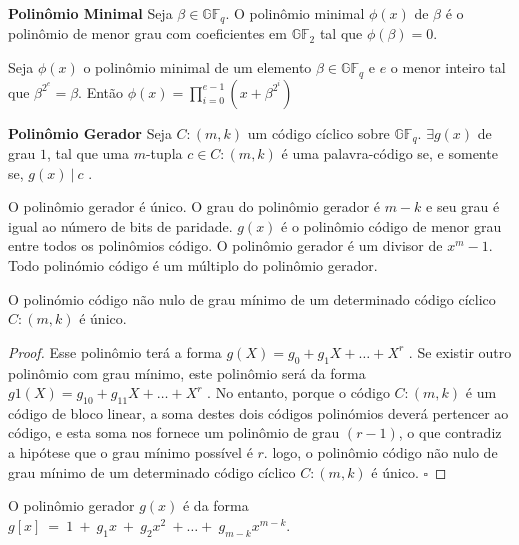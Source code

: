 \begin{definition} {\bf Polinômio Minimal} \label{PolMinimal}   Seja $\beta \in \mathbb{GF}_q$. O polinômio minimal $\phi(x)$ de $\beta$ é o polinômio de menor grau com coeficientes em $\mathbb{GF}_2$ tal que $\phi(\beta)=0$.
\end{definition}

\begin{theorem} Seja $\phi(x)$ o polinômio minimal de um elemento $\beta \in \mathbb{GF}_q$ e $e$ o menor inteiro tal que $\beta^{2^{e}}=\beta$. Então $\phi(x)= \displaystyle\prod\limits_{i=0}^{e-1} (x + \beta^{2^{i}})$
\end{theorem}

\begin{definition} {\bf Polinômio Gerador} \label{PolGer}  Seja $C:(m,k)$ um código cíclico sobre $\mathbb{GF}_q$. $\exists g(x)$ de grau $1$, tal que uma $m$-tupla $c \in C:(m,k)$ é uma palavra-código se, e somente se, $g(x)\ |\ c$ .
\end{definition}

\begin{property} O polinômio gerador é único. O grau do polinômio gerador é $m-k$ e seu grau é igual ao número de bits de paridade. $g(x)$ é o polinômio código de menor grau entre todos os polinômios código. O polinômio gerador é um divisor de $x^m -1$. Todo polinómio código é um múltiplo do polinômio gerador.
\end{property}

\begin{proposition} O polinómio código não nulo de grau mínimo de um determinado código cíclico $C:(m,k)$ é único.
\end{proposition}

\begin{proof} Esse polinômio terá a forma $g(X) = g_0 + g_1X + \ldots + X^r$ . Se existir outro polinômio com grau mínimo, este polinômio será da forma $g1 (X) = g_{10} + g_{11} X + \ldots + X^r$ . No entanto, porque o código $C:(m,k)$  é um código de bloco linear, a soma destes dois códigos
polinómios deverá pertencer ao código, e esta soma nos fornece um polinômio de grau $(r-1)$, o que contradiz a hipótese que o grau mínimo possível é $r$. logo, o polinômio código não nulo de grau mínimo de um determinado código cíclico $C:(m,k)$ é único. $\square$
\end{proof}

\begin{definition} O polinômio gerador $g(x)$ é da forma $g[x]\ =\ 1\ +\ g_1x\ +\ g_2x^2\ + \ldots +\ g_{m-k}x^{m-k}$.
\end{definition}

